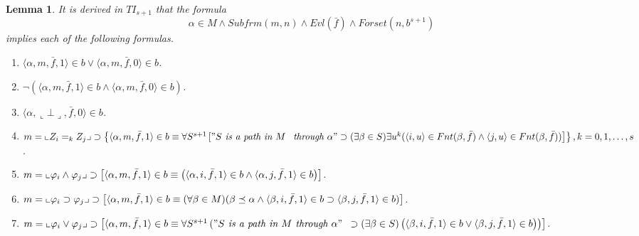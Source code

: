 \documentclass{asl}
\newtheorem{lemma}{Lemma}[section]
\theoremstyle{definition}
\begin{document}
\begin{lemma}
It is derived in $TI_{s+1}$ that the formula 
\[\alpha\in M\wedge Subfrm(m,n)\wedge Evl(\bar{f})\wedge Forset(n,b^{s+1})\]
implies each of the following formulas.
\begin{enumerate}

\item $\langle\alpha, m,\bar{f},1 \rangle\in b \vee \langle \alpha,m,\bar{f},0 \rangle\in b$.
\medskip

\item $\neg (\langle\alpha, m,\bar{f},1 \rangle\in b \wedge \langle \alpha,m,\bar{f},0 \rangle \in b)$.
\medskip

\item $\langle\alpha, \llcorner \bot \lrcorner,\bar{f},0 \rangle \in b$.
\medskip

\item $ m=\llcorner Z_i=_k Z_j\lrcorner 
\supset 
\left\lbrace\langle\alpha,m,\bar{f},1\rangle\in b \equiv 
\forall S^{s+1}\left["S\textit{ is a path in }M
\right.
\right.
\medskip
\\
\left.
\left.
\textit{through }\alpha" 
\supset(\exists\beta\in S)\exists u^k
(\langle i,u\rangle\in Fnt(\beta,\bar{f})\wedge\langle j,u\rangle\in Fnt(\beta,\bar{f}))
\right]\right\rbrace,
\\k=0,1,\ldots,s  $.
\medskip

\item $m=\llcorner \varphi_i \wedge \varphi_j\lrcorner 
\\
\supset \left[\langle\alpha, m,\bar{f},1\rangle \in b \equiv \left(\langle \alpha,i,\bar{f},1\rangle \in b \wedge \langle\alpha, j,\bar{f},1\rangle \in b \right)\right]$.
\medskip

\item $m=\llcorner \varphi_i \supset \varphi_j\lrcorner 
\\
\supset \left[\langle\alpha, m,\bar{f},1\rangle \in b \equiv 
(\forall\beta\in M)(\beta\preceq\alpha\wedge\langle\beta, i,\bar{f},1\rangle \in b\supset\langle\beta, j,\bar{f},1\rangle \in b)\right] $.
\medskip

\item $m=\llcorner \varphi_i \vee \varphi_j\lrcorner 
\supset \left[\langle\alpha, m,\bar{f},1\rangle \in b  
\equiv 
\forall S^{s+1}\left("S\textit{ is a path in }M\textit{ through }\alpha" 
\right.
\right.
\medskip
\\
\left.
\left.
\supset(\exists\beta\in S)\left(\langle \beta,i,\bar{f},1\rangle \in b\vee\langle \beta,j,\bar{f},1\rangle \in b\right) \right)
\right]$.
\medskip


\end{enumerate}
\end{lemma}
\end{document}
